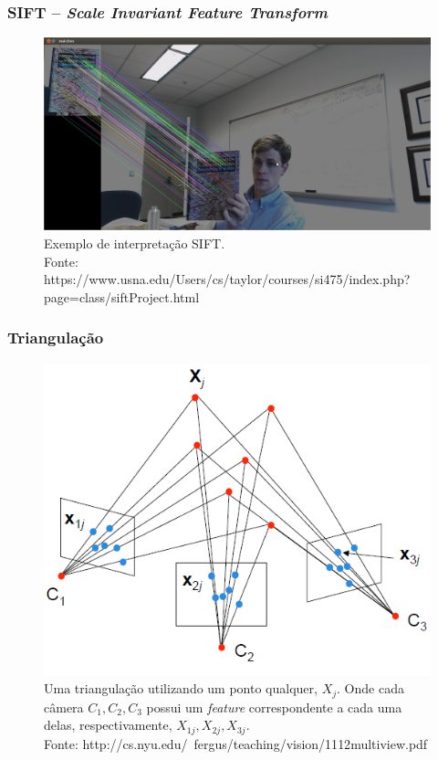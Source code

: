 \documentclass[table, usenames, svgnames, xcolor=dvipsnames]{beamer}
\begin{document}
\begin{frame}
\frametitle{\textbf{SIFT -- \emph{Scale Invariant Feature Transform}}}
	\begin{center}		
		\begin{figure}[!h]
			\centering
			\includegraphics[width=1\linewidth]{figs/sift1.png}
			\caption{%
				Exemplo de interpretação SIFT. \\
			\tiny{Fonte: https://www.usna.edu/Users/cs/taylor/courses/si475/index.php?page=class/siftProject.html}
			}
		\end{figure}
	\end{center}
\end{frame}

\begin{frame}
\frametitle{\textbf{Triangulação}}
	\begin{center}
		\begin{figure} [!h]
			\centering
			\includegraphics[width=0.45\linewidth]{figs/triangulacao.png}
			\caption{%
				Uma triangulação utilizando um ponto qualquer, $X_j$. Onde cada câmera $C_1, C_2, C_3$ possui um \emph{feature} correspondente a cada uma delas, respectivamente, $X_{1j}, X_{2j}, X_{3j}$. \\
				\tiny{Fonte: http://cs.nyu.edu/~fergus/teaching/vision/11\underline{\space}12\underline{\space}multiview.pdf}
		}
		\end{figure}
	\end{center}
\end{frame}
\end{document}
